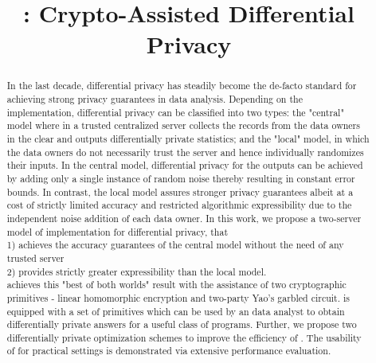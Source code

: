 \documentclass[sigconf]{acmart}
\begin{document}
\title{\system: Crypto-Assisted Differential Privacy}
\author{}
\begin{abstract}
In the last decade, differential privacy has steadily become the de-facto standard for achieving strong privacy guarantees in data analysis. Depending on the implementation, differential privacy can be classified into two types: the "central" model where in a trusted centralized server collects the records from the data owners in the clear and outputs differentially private statistics; and the "local" model, in which the data owners do not necessarily trust the server and hence individually randomizes their inputs.  In the central model, differential privacy for the outputs can be achieved by adding only a single instance of random noise thereby resulting in constant error bounds. In contrast, the local model assures stronger privacy guarantees  albeit at a cost of strictly limited accuracy and restricted algorithmic expressibility due to the independent noise addition of each data owner. In this work, we propose a  two-server model of implementation for differential privacy, \system  that  \\
1) achieves the accuracy guarantees of the central model without the need of any trusted server \\
2) provides strictly greater expressibility than the local model. \\
\system achieves this "best of both worlds" result with the assistance of two cryptographic primitives - linear homomorphic encryption and two-party Yao's garbled circuit. \system is equipped with a set of primitives which can be used by an data analyst to obtain differentially private answers for a useful class of programs. Further, we propose two differentially private optimization schemes to improve the efficiency of \system.  The  usability of \system for practical settings is demonstrated via extensive performance evaluation.
\end{abstract}

\maketitle







%




\appendix





\end{document}

